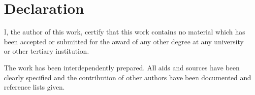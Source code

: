 \chapter{Declaration}

I, the author of this work, certify that this work contains no material which has been accepted or submitted for the award of any other degree at any university or other tertiary institution.

The work has been interdependently prepared. 
All aids and sources have been clearly specified and the contribution of other authors have been documented and reference lists given.



\signature{Eduard Szöcs}
